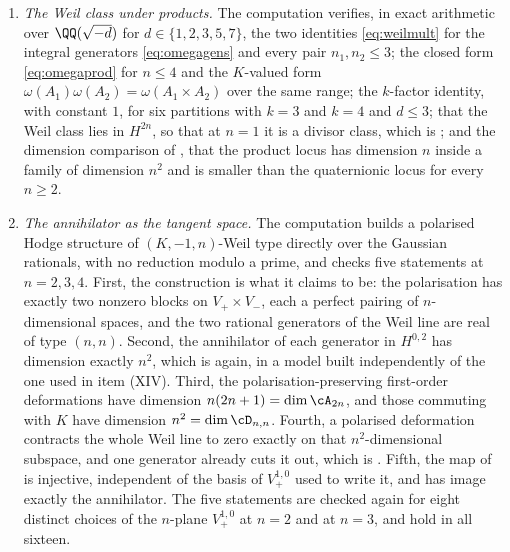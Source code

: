 \begin{enumerate}[label=\textup{(\Roman*)},leftmargin=*]
\item \emph{The Weil class under products.} The computation verifies, in
  exact arithmetic over $\QQ(\sqrt{-d})$ for $d\in\{1,2,3,5,7\}$, the two
  identities \eqref{eq:weilmult} for the integral generators
  \eqref{eq:omegagens} and every pair $n_{1},n_{2}\le3$; the closed form
  \eqref{eq:omegaprod} for $n\le4$ and the $K$-valued form
  $\omega(A_{1})\omega(A_{2})=\omega(A_{1}\times A_{2})$ over the same
  range; the $k$-factor identity, with constant $1$, for six partitions
  with $k=3$ and $k=4$ and $d\le3$; that the Weil class lies in $H^{2n}$, so that at
  $n=1$ it is a divisor class, which is ; and the
  dimension comparison of , that the product locus has
  dimension $n$ inside a family of dimension $n^{2}$ and is smaller than the
  quaternionic locus for every $n\ge2$.

\item \emph{The annihilator as the tangent space.} The computation builds a
  polarised Hodge structure of $(K,-1,n)$-Weil type directly over the
  Gaussian rationals, with no reduction modulo a prime, and checks five
  statements at $n=2,3,4$. First, the construction is what it claims to be:
  the polarisation has exactly two nonzero blocks on $V_{+}\times V_{-}$,
  each a perfect pairing of $n$-dimensional spaces, and the two rational
  generators of the Weil line are real of type $(n,n)$. Second, the
  annihilator of each generator in $H^{0,2}$ has dimension exactly $n^{2}$,
  which is  again, in a model built independently of
  the one used in item (XIV). Third, the polarisation-preserving first-order
  deformations have dimension $n(2n+1)=\dim\cA_{2n}$, and those commuting
  with $K$ have dimension $n^{2}=\dim\cD_{n,n}$. Fourth, a polarised
  deformation contracts the whole Weil line to zero exactly on that
  $n^{2}$-dimensional subspace, and one generator already cuts it out, which
  is . Fifth, the map of  is
  injective, independent of the basis of $V_{+}^{1,0}$ used to write it, and
  has image exactly the annihilator. The five statements are checked again
  for eight distinct choices of the $n$-plane $V_{+}^{1,0}$ at $n=2$ and at
  $n=3$, and hold in all sixteen.


\end{enumerate}
